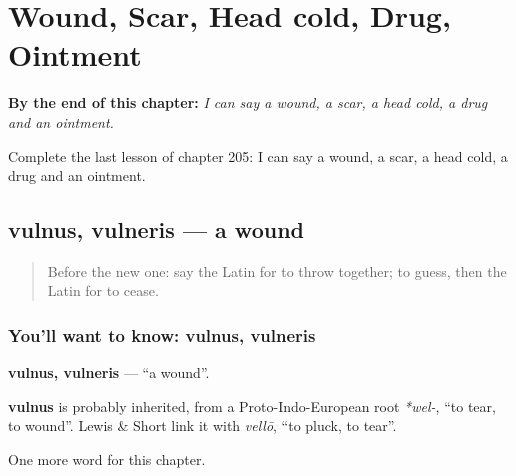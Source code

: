 
\chapter{Wound, Scar, Head cold, Drug, Ointment}
\label{ch:la-wound-scar-head-cold-drug-ointment}

\begin{chapteropening}
\textbf{By the end of this chapter:} \emph{I can say a wound, a scar, a head cold, a drug and an ointment.}

Complete the last lesson of chapter 205: I can say a wound, a scar, a head cold, a drug and an ointment.
\end{chapteropening}

\section[vulnus, vulneris]{vulnus, vulneris — a wound}

\label{lesson:LA-C205-vulnus}



\begin{quote}
Before the new one: say the Latin for to throw together; to guess, then the Latin for to cease.
\end{quote}

\subsection*{You'll want to know: vulnus, vulneris}
\textbf{vulnus, vulneris} — \textquotedblleft{}a wound\textquotedblright{}.

\begin{cousinweb}
\textbf{vulnus} is probably inherited, from a Proto-Indo-European root \emph{*wel-}, \textquotedblleft{}to tear, to wound\textquotedblright{}. Lewis \& Short link it with \emph{vellō}, \textquotedblleft{}to pluck, to tear\textquotedblright{}.
\end{cousinweb}

\begin{grammarlens}[title={What you've built}]
One more word for this chapter.
\end{grammarlens}

